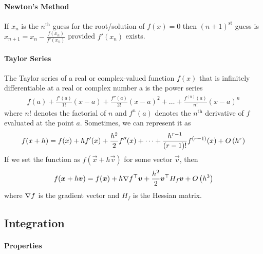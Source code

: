 \paragraph{Newton's Method}

If $x_n$ is the $n^\text{th}$ guess for the root/solution of $f(x)=0$ then $(n+1)^\text{st}$ guess is $x_{n+1}=x_n-\frac{f(x_n)}{f'(x_n)}$ provided $f'(x_n)$ exists.

\paragraph{Taylor Series}

The Taylor series of a real or complex-valued function $f(x)$ that is infinitely differentiable at a real or complex number a is the power series
\begin{align*}
	f(a)+\frac{f'(a)}{1!}(x-a)+\frac{f''(a)}{2!}(x-a)^2+\dots+\frac{f^{(n)}(a)}{n!}(x-a)^n
\end{align*}
where $n!$ denotes the factorial of $n$ and $f^{n}(a)$ denotes the $n^\text{th}$ derivative of $f$ evaluated at the point $a$. Sometimes, we can represent it as
\begin{align*}
	f(x+h)=f(x)+hf'(x)+\frac{h^2}{2}f''(x)+\cdots+\frac{h^{r-1}}{(r-1)!}f^{(r-1)}(x)+O\left(h^r\right)
\end{align*}
If we set the function as $f(\vec{x}+h\vec{v})$ for some vector $\vec{v}$, then
\begin{align*}
	f(\boldsymbol{x}+h\boldsymbol{v})=f(\boldsymbol{x})+h\nabla f{}^\top\boldsymbol{v}+\frac{h^2}{2}\boldsymbol{v}{}^\top H_f\boldsymbol{v}+O\left(h^3\right)
\end{align*}
where $\nabla f$ is the gradient vector and $H_f$ is the Hessian matrix.

\subsection{Integration}

\paragraph{Properties}

